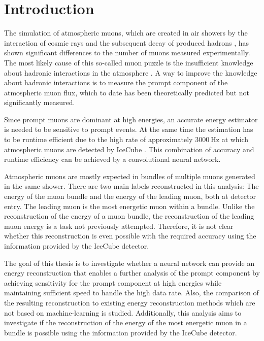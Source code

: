 \documentclass[
  tucolor,       %
  BCOR=12mm,     %
  parskip=half,  %
  open=any,      %
  cleardoublepage=plain,  %
]{tudothesis}
\begin{document}
\mainmatter
\chapter{Introduction}
The simulation of atmospheric muons, which are created in air showers by the interaction of cosmic rays and the subsequent decay of produced hadrons \cite{gaisser_engel_resconi_2016}, has shown significant differences to the number of muons measured experimentally.
The most likely cause of this so-called muon puzzle is the insufficient knowledge about hadronic interactions in the atmosphere \cite{Albrecht_2022}. 
A way to improve the knowledge about hadronic interactions is to measure the prompt component of the atmospheric muon flux, which to date has been theoretically predicted but not significantly measured.

Since prompt muons are dominant at high energies, an accurate energy estimator is needed to be sensitive to prompt events.
At the same time the estimation has to be runtime efficient due to the high rate of approximately $\SI{3000}{\hertz}$ at which atmospheric muons are detected by IceCube \cite{Aartsen_2016}.
This combination of accuracy and runtime efficiency can be achieved by a convolutional neural network.

Atmospheric muons are mostly expected in bundles of multiple muons generated in the same shower. There are two main labels reconstructed in this analysis: The energy of the muon bundle and the energy of the leading muon, both at detector entry. The leading muon is the most energetic muon within a bundle.
Unlike the reconstruction of the energy of a muon bundle, the reconstruction of the leading muon energy is a task not previously attempted.
Therefore, it is not clear whether this reconstruction is even possible with the required accuracy using the information provided by the IceCube detector.

The goal of this thesis is to investigate whether a neural network can provide an energy reconstruction that enables a further analysis of the prompt component by achieving sensitivity for the prompt component at high energies while maintaining sufficient speed to handle the high data rate.
Also, the comparison of the resulting reconstruction to existing energy reconstruction methods which are not based on machine-learning is studied.
Additionally, this analysis aims to investigate if the reconstruction of the energy of the most energetic muon in a bundle is possible using the information provided by the IceCube detector.
\end{document}
